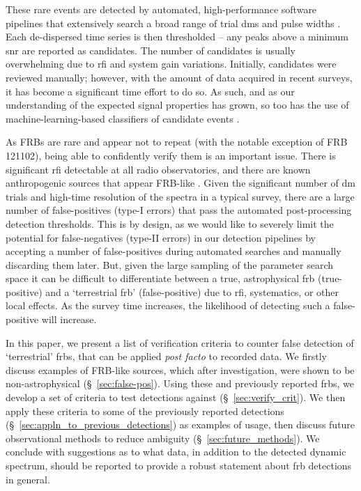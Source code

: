 \documentclass[a4paper,fleqn,usenatbib]{mnras}
\begin{document}
These rare events are detected by automated, high-performance software pipelines
that extensively search a broad range of trial \glspl{dm} and pulse widths
\citep{Barsdell2012, 2015MNRAS.452.1254K, Bannister2017, Chime2018}. Each
de-dispersed time series is then thresholded -- any peaks above a minimum
\gls{snr} are reported as candidates. The number of candidates is usually
overwhelming due to \gls{rfi} and system gain variations. Initially, candidates
were reviewed manually; however, with the amount of data acquired in recent
surveys, it has become a significant time effort to do so. As such, and as our
understanding of the expected signal properties has grown, so too has the use of
machine-learning-based classifiers of candidate events
\citep[e.g.][]{Wagstaff2016, 2018MNRAS.474.3847F, Farah2018, Connor2018}.

As FRBs are rare and appear not to repeat (with the notable exception of
FRB\,121102), being able to confidently verify them is an important issue. There
is significant \gls{rfi} detectable at all radio observatories, and there are
known anthropogenic sources that appear FRB-like \citep{2015MNRAS.451.3933P}.
Given the significant number of \gls{dm} trials and high-time resolution of the
spectra in a typical survey, there are a large number of false-positives (type-I
errors) that pass the automated post-processing detection thresholds.  This is
by design, as we would like to severely limit the potential for false-negatives
(type-II errors) in our detection pipelines by accepting a number of
false-positives during automated searches and manually discarding them later.
But, given the large sampling of the parameter search space it can be difficult
to differentiate between a true, astrophysical \gls{frb} (true-positive) and a
`terrestrial \gls{frb}' (false-positive) due to \gls{rfi}, systematics, or other
local effects. As the survey time increases, the likelihood of detecting such a
false-positive will increase. 

In this paper, we present a list of verification criteria to counter false
detection of `terrestrial' \glspl{frb}, that can be applied \emph{post facto} to
recorded data. We firstly discuss examples of FRB-like sources, which after
investigation, were shown to be non-astrophysical (\S~\ref{sec:false-pos}).
Using these and previously reported \glspl{frb}, we develop a set of criteria to
test detections against (\S~\ref{sec:verify_crit}). We then apply these criteria
to some of the previously reported detections
(\S~\ref{sec:appln_to_previous_detections}) as examples of usage, then discuss
future observational methods to reduce ambiguity (\S~\ref{sec:future_methods}).
We conclude with suggestions as to what data, in addition to the detected
dynamic spectrum, should be reported to provide a robust statement about
\gls{frb} detections in general.
\end{document}
